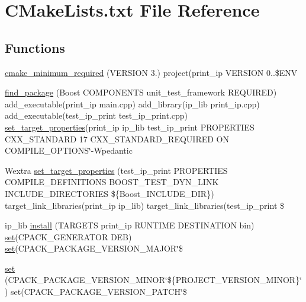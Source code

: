 \hypertarget{CMakeLists_8txt}{}\section{C\+Make\+Lists.\+txt File Reference}
\label{CMakeLists_8txt}
\subsection*{Functions}
\begin{DoxyCompactItemize}
\item 
\hyperlink{CMakeLists_8txt_a149ac2a2c7b91844a3e1b08ae0d9ed3f}{cmake\+\_\+minimum\+\_\+required} (V\+E\+R\+S\+I\+ON 3.) project(print\+\_\+ip V\+E\+R\+S\+I\+ON 0..\$E\+NV
\item 
\hyperlink{CMakeLists_8txt_ad0c289aa6e9064a15904adffe79848f3}{find\+\_\+package} (Boost C\+O\+M\+P\+O\+N\+E\+N\+TS unit\+\_\+test\+\_\+framework R\+E\+Q\+U\+I\+R\+ED) add\+\_\+executable(print\+\_\+ip main.\+cpp) add\+\_\+library(ip\+\_\+lib print\+\_\+ip.\+cpp) add\+\_\+executable(test\+\_\+ip\+\_\+print test\+\_\+ip\+\_\+print.\+cpp) \hyperlink{CMakeLists_8txt_a981e44eb2eb86a763ac0609e8597a611}{set\+\_\+target\+\_\+properties}(print\+\_\+ip ip\+\_\+lib test\+\_\+ip\+\_\+print P\+R\+O\+P\+E\+R\+T\+I\+ES C\+X\+X\+\_\+\+S\+T\+A\+N\+D\+A\+RD 17 C\+X\+X\+\_\+\+S\+T\+A\+N\+D\+A\+R\+D\+\_\+\+R\+E\+Q\+U\+I\+R\+ED ON C\+O\+M\+P\+I\+L\+E\+\_\+\+O\+P\+T\+I\+O\+NS\char`\"{}-\/Wpedantic
\item 
Wextra \hyperlink{CMakeLists_8txt_a981e44eb2eb86a763ac0609e8597a611}{set\+\_\+target\+\_\+properties} (test\+\_\+ip\+\_\+print P\+R\+O\+P\+E\+R\+T\+I\+ES C\+O\+M\+P\+I\+L\+E\+\_\+\+D\+E\+F\+I\+N\+I\+T\+I\+O\+NS B\+O\+O\+S\+T\+\_\+\+T\+E\+S\+T\+\_\+\+D\+Y\+N\+\_\+\+L\+I\+NK I\+N\+C\+L\+U\+D\+E\+\_\+\+D\+I\+R\+E\+C\+T\+O\+R\+I\+ES \$\{Boost\+\_\+\+I\+N\+C\+L\+U\+D\+E\+\_\+\+D\+IR\}) target\+\_\+link\+\_\+libraries(print\+\_\+ip ip\+\_\+lib) target\+\_\+link\+\_\+libraries(test\+\_\+ip\+\_\+print \$
\item 
ip\+\_\+lib \hyperlink{CMakeLists_8txt_ad5b09882d4ffa0b2549cdcd18161c85d}{install} (T\+A\+R\+G\+E\+TS print\+\_\+ip R\+U\+N\+T\+I\+ME D\+E\+S\+T\+I\+N\+A\+T\+I\+ON bin) \hyperlink{CMakeLists_8txt_abed8177b0359bb37e78aebe0412cc156}{set}(C\+P\+A\+C\+K\+\_\+\+G\+E\+N\+E\+R\+A\+T\+OR D\+EB) \hyperlink{CMakeLists_8txt_abed8177b0359bb37e78aebe0412cc156}{set}(C\+P\+A\+C\+K\+\_\+\+P\+A\+C\+K\+A\+G\+E\+\_\+\+V\+E\+R\+S\+I\+O\+N\+\_\+\+M\+A\+J\+OR\char`\"{}\$
\item 
\hyperlink{CMakeLists_8txt_abed8177b0359bb37e78aebe0412cc156}{set} (C\+P\+A\+C\+K\+\_\+\+P\+A\+C\+K\+A\+G\+E\+\_\+\+V\+E\+R\+S\+I\+O\+N\+\_\+\+M\+I\+N\+OR\char`\"{}\$\{P\+R\+O\+J\+E\+C\+T\+\_\+\+V\+E\+R\+S\+I\+O\+N\+\_\+\+M\+I\+N\+OR\}\char`\"{}) set(C\+P\+A\+C\+K\+\_\+\+P\+A\+C\+K\+A\+G\+E\+\_\+\+V\+E\+R\+S\+I\+O\+N\+\_\+\+P\+A\+T\+CH\char`\"{}\$
\end{DoxyCompactItemize}
